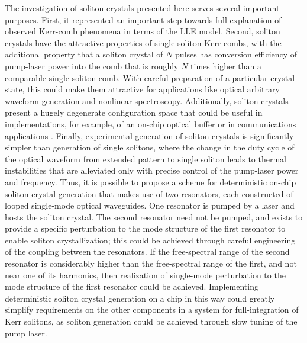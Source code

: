 The investigation of soliton crystals presented here serves several important purposes. First, it represented an important step towards full explanation of observed Kerr-comb phenomena in terms of the LLE model.  Second, soliton crystals have the attractive properties of single-soliton Kerr combs, with the additional property that a soliton crystal of $N$ pulses has conversion efficiency of pump-laser power into the comb that is roughly $N$ times higher than a comparable single-soliton comb. With careful preparation of a particular crystal state, this could make them attractive for applications like optical arbitrary waveform generation and nonlinear spectroscopy. Additionally, soliton crystals present a hugely degenerate configuration space that could be useful in implementations, for example, of an on-chip optical buffer or in communications applications \cite{Leo2010}. Finally, experimental generation of soliton crystals is significantly simpler than generation of single solitons, where the change in the duty cycle of the optical waveform from extended pattern to single soliton leads to thermal instabilities that are alleviated only with precise control of the pump-laser power and frequency. Thus, it is possible to propose a scheme for deterministic on-chip soliton crystal generation that makes use of two resonators, each constructed of looped single-mode optical waveguides. One resonator is pumped by a laser and hosts the soliton crystal. The second resonator need not be pumped, and exists to provide a specific perturbation to the mode structure of the first resonator to enable soliton crystallization; this could be achieved through careful engineering of the coupling between the resonators. If the free-spectral range of the second resonator is considerably higher than the free-spectral range of the first, and not near one of its harmonics, then realization of single-mode perturbation to the mode structure of the first resonator could be achieved. Implementing deterministic soliton crystal generation on a chip in this way could greatly simplify requirements on the other components in a system for full-integration of Kerr solitons, as soliton generation could be achieved through slow tuning of the pump laser.

